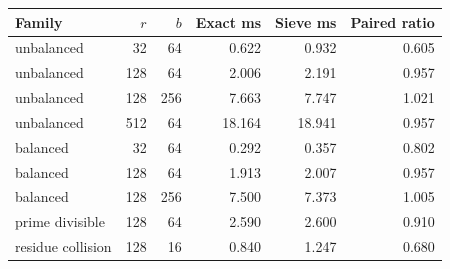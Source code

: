 \begin{tabular}{@{}lrrrrr@{}}
\toprule
Family & $r$ & $b$ & Exact ms & Sieve ms & Paired ratio \\
\midrule
unbalanced & 32 & 64 & 0.622 & 0.932 & 0.605 \\
unbalanced & 128 & 64 & 2.006 & 2.191 & 0.957 \\
unbalanced & 128 & 256 & 7.663 & 7.747 & 1.021 \\
unbalanced & 512 & 64 & 18.164 & 18.941 & 0.957 \\
balanced & 32 & 64 & 0.292 & 0.357 & 0.802 \\
balanced & 128 & 64 & 1.913 & 2.007 & 0.957 \\
balanced & 128 & 256 & 7.500 & 7.373 & 1.005 \\
prime divisible & 128 & 64 & 2.590 & 2.600 & 0.910 \\
residue collision & 128 & 16 & 0.840 & 1.247 & 0.680 \\
\bottomrule
\end{tabular}
